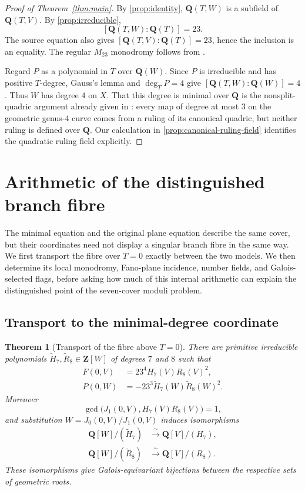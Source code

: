 \documentclass[11pt]{amsart}
\newtheorem{theorem}{Theorem}[section]
\theoremstyle{definition}
\theoremstyle{remark}
\newcommand{\QQ}{\mathbf Q}
\newcommand{\ZZ}{\mathbf Z}
\begin{document}
\begin{proof}[Proof of Theorem~\ref{thm:main}]
By \cref{prop:identity}, $\QQ(T,W)$ is a subfield of $\QQ(T,V)$.  By
\cref{prop:irreducible},
\[
 [\QQ(T,W):\QQ(T)]=23.
\]
The source equation also gives $[\QQ(T,V):\QQ(T)]=23$, hence the inclusion
is an equality.  The regular $M_{23}$ monodromy follows from
\cite[Proposition~3.5 and Corollary~3.6]{HJLPPZ}.

Regard $P$ as a polynomial in $T$ over $\QQ(W)$.  Since $P$ is irreducible
and has positive $T$-degree, Gauss's lemma and $\deg_TP=4$ give
$[\QQ(T,W):\QQ(W)]=4$.  Thus $W$ has degree $4$ on $X$.  That this degree is
minimal over $\QQ$ is the nonsplit-quadric argument already given in
\cite[Remark~3.4]{HJLPPZ}: every map of degree at most $3$ on the geometric
genus-$4$ curve comes from a ruling of its canonical quadric, but neither
ruling is defined over $\QQ$.  Our calculation in
\cref{prop:canonical-ruling-field} identifies the quadratic ruling field
explicitly.
\end{proof}

\section{Arithmetic of the distinguished branch fibre}
\label{sec:branch-fibre-arithmetic}

The minimal equation and the original plane equation describe the same
cover, but their coordinates need not display a singular branch fibre in the
same way.  We first transport the fibre over $T=0$ exactly between the two
models.  We then determine its local monodromy, Fano-plane incidence, number
fields, and Galois-selected flags, before asking how much of this internal
arithmetic can explain the distinguished point of the seven-cover moduli
problem.

\subsection{Transport to the minimal-degree coordinate}
\label{sec:coordinate-transport}

\begin{theorem}[Transport of the fibre above $T=0$]
\label{thm:branch-fibre-transport}
There are primitive irreducible polynomials
$\widetilde H_7,\widetilde R_8\in\ZZ[W]$ of degrees $7$ and $8$ such that
\[
\begin{aligned}
 F(0,V)&=23^4H_7(V)R_8(V)^2,\\
 P(0,W)&=-23^3\widetilde H_7(W)\widetilde R_8(W)^2.
\end{aligned}
\]
Moreover
\[
 \gcd\bigl(J_1(0,V),H_7(V)R_8(V)\bigr)=1,
\]
and substitution $W=J_0(0,V)/J_1(0,V)$ induces isomorphisms
\[
\begin{aligned}
 \QQ[W]/(\widetilde H_7)&\xrightarrow{\ \sim\ }\QQ[V]/(H_7),\\
 \QQ[W]/(\widetilde R_8)&\xrightarrow{\ \sim\ }\QQ[V]/(R_8).
\end{aligned}
\]
These isomorphisms give Galois-equivariant bijections between the respective
sets of geometric roots.
\end{theorem}
\end{document}
